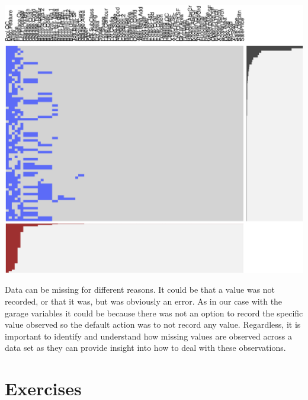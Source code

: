 \documentclass[]{article}
\begin{document}
\begin{center}\includegraphics{Chapter_3_-_Visualization_files/figure-latex/missing2-1} \end{center}

Data can be missing for different reasons. It could be that a value was
not recorded, or that it was, but was obviously an error. As in our case
with the garage variables it could be because there was not an option to
record the specific value observed so the default action was to not
record any value. Regardless, it is important to identify and understand
how missing values are observed across a data set as they can provide
insight into how to deal with these observations.

\section{Exercises}\label{exercises}
\end{document}
